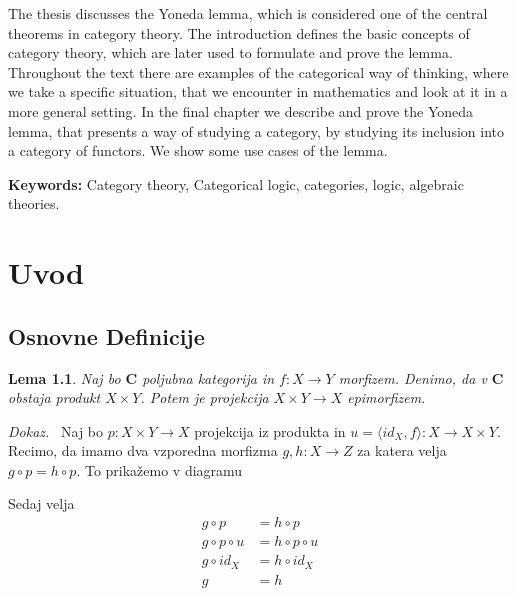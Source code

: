 \documentclass[12pt,a4paper]{book}
\newcommand{\tkeywordsEn}{Category theory, Categorical logic, categories, logic, algebraic theories}
\newcommand{\clearemptydoublepage}{\newpage{\pagestyle{empty}\cleardoublepage}}
\theoremstyle{definition}
\theoremstyle{plain}
\newtheorem{lema}[definicija]{Lema}
\newenvironment{dokaz}{\emph{Dokaz.}\ }{\hspace{\fill}{$\Box$}}
\theoremstyle{definition}
\theoremstyle{remark}
\newcommand{\cat}[1]{\textbf{#1}}
\begin{document}
\noindent 
The thesis discusses the Yoneda lemma, which is considered one of the central theorems in category theory. The introduction defines the basic concepts of category theory, which are later used to formulate and prove the lemma. Throughout the text there are examples of the categorical way of thinking, where we take a specific situation, that we encounter in mathematics and look at it in a more general setting. In the final chapter we describe and prove the Yoneda lemma, that presents a way of studying a category, by studying its inclusion into a category of functors. We show some use cases of the lemma.

\bigskip

\noindent\textbf{Keywords:} \tkeywordsEn.
\clearemptydoublepage

\mainmatter
\setcounter{page}{1}
\pagestyle{fancy}

\chapter{Uvod}


\section{Osnovne Definicije}

\begin{lema}
Naj bo $\cat{C}$ poljubna kategorija in $f : X \to Y$ morfizem. Denimo, da v $\cat{C}$ obstaja produkt $X \times Y$. Potem je projekcija $X \times Y \to X$ epimorfizem.
\end{lema}
\begin{dokaz}
Naj bo $p : X \times Y \to X$ projekcija iz produkta in $u = \langle id_X, f \rangle : X \to X \times Y$. Recimo, da imamo dva vzporedna morfizma $g,h : X \to Z$ za katera velja $g \circ p = h \circ p$. To prikažemo v diagramu
\begin{center}
\end{center}
Sedaj velja
\begin{align*}
g \circ p &= h \circ p \\
g \circ p \circ u &= h \circ p \circ u \\
g \circ id_X &= h \circ id_X \\
g &= h
\end{align*}
\end{dokaz}
\end{document}
